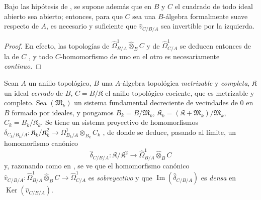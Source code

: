 \begin{corollary}[20.7.19]
\label{0.20.7.19-fr}
Bajo las hipótesis de , se supone además que en $B$ y
$C$ el cuadrado de todo ideal abierto sea abierto; entonces, para que $C$ sea
una $B$-álgebra formalmente suave respecto de $A$, es necesario y suficiente
que $\widehat v_{C/B/A}$ sea invertible por la izquierda.
\end{corollary}

\begin{proof}
En efecto, las topologías de
$\widehat{\Omega}^1_{B/A}\widehat\otimes_B C$ y de
$\widehat{\Omega}^1_{C/A}$ se deducen entonces de la de $C$
, y todo $C$-homomorfismo de uno en el otro es
necesariamente \emph{continuo}.
\end{proof}

\begin{env}[20.7.20]
\label{0.20.7.20-fr}
Sean $A$ un anillo topológico, $B$ una $A$-álgebra topológica
\emph{metrizable} y \emph{completa}, $\mathfrak{K}$ un ideal \emph{cerrado} de $B$,
$C=B/\mathfrak{K}$ el anillo topológico cociente, que es metrizable y
completo. Sea $(\mathfrak{M}_k)$ un sistema fundamental decreciente de
vecindades de $0$ en $B$ formado por ideales, y pongamos
$B_k=B/\mathfrak{M}_k$,
$\mathfrak{K}_k=(\mathfrak{K}+\mathfrak{M}_k)/\mathfrak{M}_k$,
$C_k=B_k/\mathfrak{K}_k$. Se tiene un sistema proyectivo de homomorfismos
$\delta_{C_k/B_k/A}:\mathfrak{K}_k/\mathfrak{K}_k^2\to\Omega^1_{B_k/A}\otimes_{B_k}C_k$
, de donde se deduce, pasando al límite, un
homomorfismo canónico
\[
  \widehat\delta_{C/B/A}:\mathfrak{K}/\mathfrak{K}^2\to
  \widehat{\Omega}^1_{B/A}\widehat\otimes_B C
\]
y, razonando como en , se ve que el homomorfismo canónico
$\widehat v_{C/B/A}:\widehat{\Omega}^1_{B/A}
\widehat\otimes_B C\to\widehat{\Omega}^1_{C/A}$ es
\emph{sobreyectivo} y que $\operatorname{Im}(\widehat\delta_{C/B/A})$ es
\emph{densa} en $\operatorname{Ker}(\widehat v_{C/B/A})$.
\end{env}
